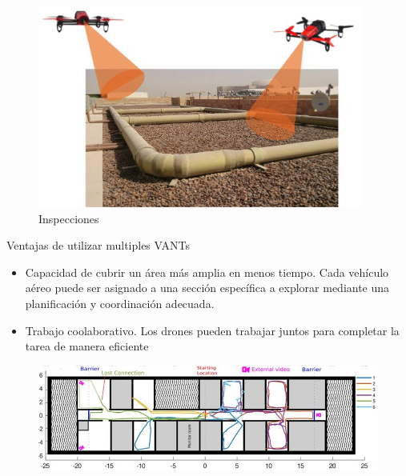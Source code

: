 \documentclass[
	11pt, %
]{beamer}
\begin{document}
\begin{frame}
  \begin{figure}
    \includegraphics[width=0.7\linewidth]{pipe_inspect}
    \caption{Inspecciones}
  \end{figure}
\end{frame}



\begin{frame}
  
  Ventajas de utilizar multiples VANTs

  \begin{itemize}
  \item Capacidad de cubrir un área más amplia en menos tiempo. Cada vehículo aéreo puede ser asignado a una sección específica a explorar mediante una planificación y coordinación adecuada.
  \item Trabajo coolaborativo. Los drones pueden trabajar juntos para completar la tarea de manera eficiente
  \end{itemize}
    
  \begin{figure}
    \includegraphics[width=0.7\linewidth]{drones-3.jpg}
  \end{figure}
  
\end{frame}
\end{document}
